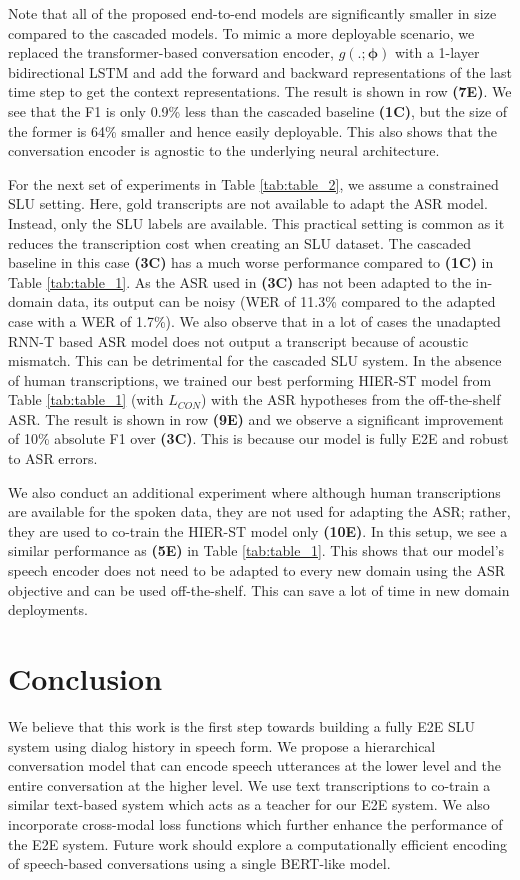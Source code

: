 \documentclass{article}
\begin{document}
Note that all of the proposed end-to-end models are significantly smaller in size compared to the cascaded models. To mimic a more deployable scenario, we replaced the transformer-based conversation encoder, $g(.;\boldsymbol\phi)$ with a 1-layer bidirectional LSTM and add the forward and backward representations of the last time step to get the context representations. The result is shown in row \textbf{(7E)}. We see that the F1 is only 0.9\% less than the cascaded baseline \textbf{(1C)}, but the size of the former is 64\% smaller and hence easily deployable. This also shows that the conversation encoder is agnostic to the underlying neural architecture.


For the next set of experiments in Table \ref{tab:table_2}, we assume a constrained SLU setting. Here, gold transcripts are not available to adapt the ASR model. Instead, only the SLU labels are available. This practical setting is common as it reduces the transcription cost when creating an SLU dataset. The cascaded baseline in this case \textbf{(3C)} has a much worse performance compared to \textbf{(1C)} in Table \ref{tab:table_1}. As the ASR used in \textbf{(3C)} has not been adapted to the in-domain data, its output can be noisy (WER of 11.3\% compared to the adapted case with a WER of 1.7\%). We also observe that in a lot of cases the unadapted RNN-T based ASR model does not output a transcript because of acoustic mismatch. This can be detrimental for the cascaded SLU system. In the absence of human transcriptions, we trained our best performing HIER-ST model from Table \ref{tab:table_1} (with $L_{CON}$) with the ASR hypotheses from the off-the-shelf ASR. The result is shown in row \textbf{(9E)} and we observe a significant improvement of 10\% absolute F1 over \textbf{(3C)}. This is because our model is fully E2E and robust to ASR errors.

We also conduct an additional experiment where although human transcriptions are available for the spoken data, they are not used for adapting the ASR; rather, they are used to co-train the HIER-ST model only \textbf{(10E)}. In this setup, we see a similar performance as \textbf{(5E)} in Table \ref{tab:table_1}. This shows that our model's speech encoder does not need to be adapted to every new domain using the ASR objective and can be used off-the-shelf. This can save a lot of time in new domain deployments. 

\section{Conclusion}
We believe that this work is the first step towards building a fully E2E SLU system using dialog history in speech form. We propose a hierarchical conversation model that can encode speech utterances at the lower level and the entire conversation at the higher level. We use text transcriptions to co-train a similar text-based system which acts as a teacher for our E2E system. We also incorporate cross-modal loss functions which further enhance the performance of the E2E system. Future work should explore a computationally efficient encoding of speech-based conversations using a single BERT-like model. 
\end{document}
